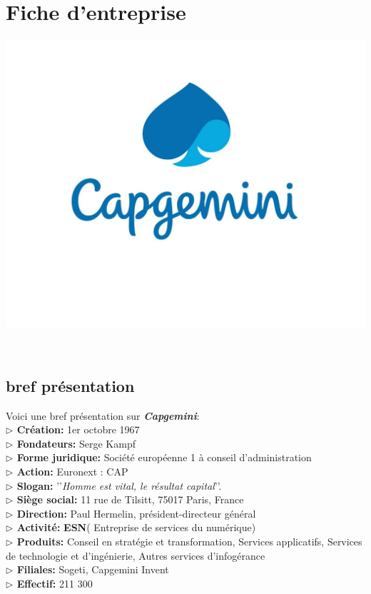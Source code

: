 \documentclass[a4paper, 12pt,french,oneside]{book}%
\theoremstyle{definition}
\theoremstyle{remark}
\begin{document}
\chapter{Fiche d'entreprise}
\begin{minipage}{\linewidth}
	\centering
		\includegraphics[keepaspectratio=true,scale=0.2]{image/cap}
\end{minipage}\vspace{0.3cm}\\

\section{bref présentation}
Voici une bref présentation sur \textbf{\textit{Capgemini}}:\\
\textbf{$\rhd$ Création:} 1er octobre 1967\\
\textbf{$\rhd$ Fondateurs:} Serge Kampf\\
\textbf{$\rhd$ Forme juridique:} Société européenne 1 à conseil d'administration\\
\textbf{$\rhd$ Action:} Euronext : CAP\\
\textbf{$\rhd$ Slogan:} ’’\textit{Homme est vital, le résultat capital}’’.\\
\textbf{$\rhd$ Siège social:} 11 rue de Tilsitt, 75017 Paris, France\\
\textbf{$\rhd$ Direction:} Paul Hermelin, président-directeur général\\
\textbf{$\rhd$ Activité:} \textbf{ESN}( Entreprise de services du numérique)\\
\textbf{$\rhd$ Produits:} Conseil en stratégie et transformation, Services applicatifs, Services de technologie et d'ingénierie, Autres services d'infogérance \\
\textbf{$\rhd$ Filiales:} Sogeti, Capgemini Invent\\
\textbf{$\rhd$ Effectif:} 	211 300\\
\end{document}
